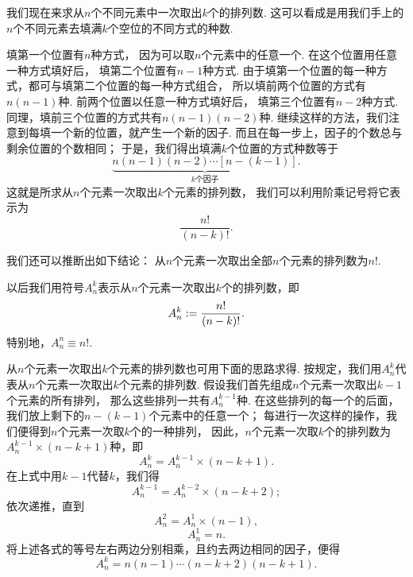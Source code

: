 我们现在来求从\(n\)个不同元素中一次取出\(k\)个的排列数.
这可以看成是用我们手上的\(n\)个不同元素去填满\(k\)个空位的不同方式的种数.

填第一个位置有\(n\)种方式，
因为可以取\(n\)个元素中的任意一个.
在这个位置用任意一种方式填好后，
填第二个位置有\(n-1\)种方式.
由于填第一个位置的每一种方式，都可与填第二个位置的每一种方式组合，
所以填前两个位置的方式有\(n(n-1)\)种.
前两个位置以任意一种方式填好后，
填第三个位置有\(n-2\)种方式.
同理，填前三个位置的方式共有\(n(n-1)(n-2)\)种.
继续这样的方法，我们注意到每填一个新的位置，就产生一个新的因子.
而且在每一步上，因子的个数总与剩余位置的个数相同；
于是，我们得出填满\(k\)个位置的方式种数等于\begin{equation*}
	\underbrace{n(n-1)(n-2)\dotsm[n-(k-1)]}_{\text{$k$个因子}}.
\end{equation*}
这就是所求从\(n\)个元素一次取出\(k\)个元素的排列数，
我们可以利用阶乘记号将它表示为\begin{equation*}
	\frac{n!}{(n-k)!}.
\end{equation*}

我们还可以推断出如下结论：
从\(n\)个元素一次取出全部\(n\)个元素的排列数为\(n!\).

以后我们用符号\(A_n^k\)表示从\(n\)个元素一次取出\(k\)个的排列数，即\begin{equation}
	A_n^k := \frac{n!}{(n-k)!}.
\end{equation}
特别地，\(A_n^n \equiv n!\).

从\(n\)个元素一次取出\(k\)个元素的排列数也可用下面的思路求得.
按规定，我们用\(A_n^k\)代表从\(n\)个元素一次取出\(k\)个元素的排列数.
假设我们首先组成\(n\)个元素一次取出\(k-1\)个元素的所有排列，
那么这些排列一共有\(A_n^{k-1}\)种.
在这些排列的每一个的后面，我们放上剩下的\(n-(k-1)\)个元素中的任意一个；
每进行一次这样的操作，我们便得到\(n\)个元素一次取\(k\)个的一种排列，
因此，\(n\)个元素一次取\(k\)个的排列数为\(A_n^{k-1} \times (n-k+1)\)种，即\begin{equation*}
	A_n^k = A_n^{k-1} \times (n-k+1).
\end{equation*}
在上式中用\(k-1\)代替\(k\)，我们得\begin{equation*}
	A_n^{k-1} = A_n^{k-2} \times (n-k+2);
\end{equation*}
依次递推，直到\begin{equation*}
	A_n^2 = A_n^1 \times (n-1),
\end{equation*}\begin{equation*}
	A_n^1 = n.
\end{equation*}
将上述各式的等号左右两边分别相乘，且约去两边相同的因子，便得\begin{equation*}
	A_n^k = n(n-1)\dotsm(n-k+2)(n-k+1).
\end{equation*}

